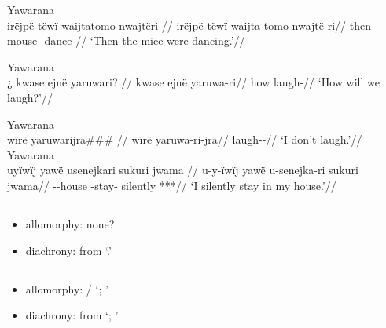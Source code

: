 \documentclass{memoir}
\begin{document}
\ex Yawarana \\
\label{ctorat-16}    \begingl
    \glpreamble irëjpë tëwï waijtatomo nwajtëri //
    \gla irëjpë tëwï waijta-tomo nwajtë-ri//
    \glb then  mouse- dance-//
        \glft ‘Then the mice were dancing.’//  
    \endgl 
\xe

\ex Yawarana \\
\label{convrisamaj-06}    \begingl
    \glpreamble ¿ kwase ejnë yaruwari? //
    \gla kwase ejnë yaruwa-ri//
    \glb how  laugh-//
        \glft ‘How will we laugh?’//  
    \endgl 
\xe

\pex\label{gnomicri}    \a Yawarana\\
    \label{convrisamaj-04}        \begingl
        \glpreamble wïrë yaruwarijra\#\#\# //
        \gla wïrë yaruwa-ri-jra//
        \glb {} laugh--//
            \glft ‘I don’t laugh.’//  
        \endgl 
    \a Yawarana\\
    \label{convrisamaj-28}        \begingl
        \glpreamble uyïwïj yawë usenejkari sukuri jwama //
        \gla u-y-ïwïj yawë u-senejka-ri sukuri jwama//
        \glb {}--house  -stay- silently ***//
            \glft ‘I silently stay in my house.’//  
        \endgl 
\xe

\subsection{\texorpdfstring{}{}}

\begin{itemize}
\tightlist
\item
  allomorphy: none?
\item
  diachrony: from  `.' 
\end{itemize}

\subsection{\texorpdfstring{}{}}

\begin{itemize}
\tightlist
\item
  allomorphy: / `; '
\item
  diachrony: from  `; ' 
\end{itemize}
\end{document}

